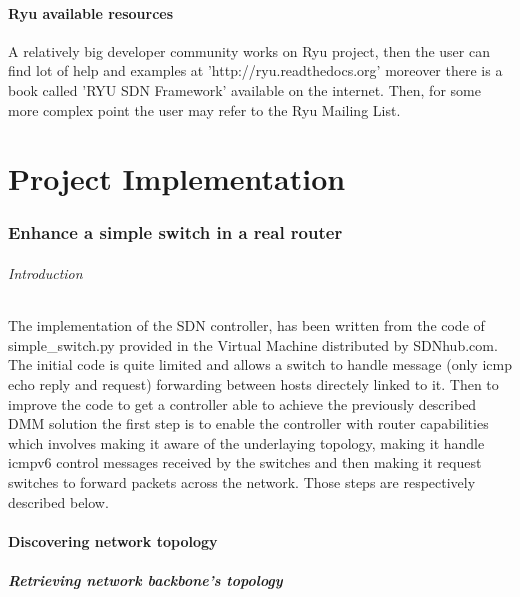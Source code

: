 \documentclass{article}
\begin{document}
\subsection{Ryu available resources}

A relatively big developer community works on Ryu project, then the
user can find lot of help and examples at 'http://ryu.readthedocs.org'
moreover there is a book called 'RYU SDN Framework' available on the
internet.  Then, for some more complex point the user may refer to
the Ryu Mailing List.

\part{Project Implementation}

\section{Enhance a simple switch in a real router}

\paragraph{Introduction}
The implementation of the SDN controller, has been written from the
code of simple\_switch.py provided in the Virtual Machine distributed
by SDNhub.com. The initial code is quite limited and allows a switch
to handle message (only icmp echo reply and request) forwarding
between hosts directely linked to it. Then to improve the code to get
a controller able to achieve the previously described DMM solution the
first step is to enable the controller with router capabilities which
involves making it aware of the underlaying topology, making it handle
icmpv6 control messages received by the switches and then making it
request switches to forward packets across the network. Those steps
are respectively described below.

\subsection{Discovering network topology}

\subsubsection{Retrieving network backbone's topology}
\end{document}
